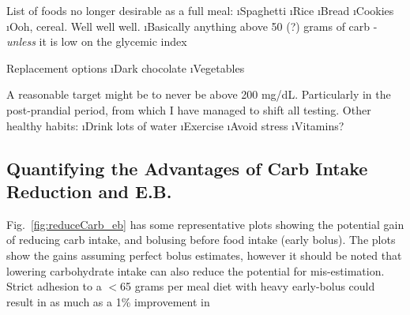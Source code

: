 List of foods no longer desirable as a full meal:
\bi
	\i Spaghetti
	\i Rice
	\i Bread
	\i Cookies
	\i Ooh, cereal. Well well well.
	\i Basically anything above 50 (?) grams of carb - {\it unless} it is low on the glycemic index
\ei

Replacement options
\bi
	\i Dark chocolate
	\i Vegetables
\ei

A reasonable target might be to never be above 200 mg/dL. Particularly in the post-prandial period, 
from which I have managed to shift all testing. Other healthy habits:
\bi
	\i Drink lots of water
	\i Exercise
	\i Avoid stress
	\i Vitamins?
\ei

\subsection{Quantifying the Advantages of Carb Intake Reduction and E.B.}

Fig.~\ref{fig:reduceCarb_eb} has some representative plots showing the potential gain of reducing 
carb intake, and bolusing before food intake (early bolus). The plots show the gains assuming perfect 
bolus estimates, however it should be noted that lowering carbohydrate intake can also reduce the 
potential for mis-estimation. Strict adhesion to a $<$65 grams per meal diet with heavy early-bolus 
could result in as much as a 1\% improvement in \hbac

